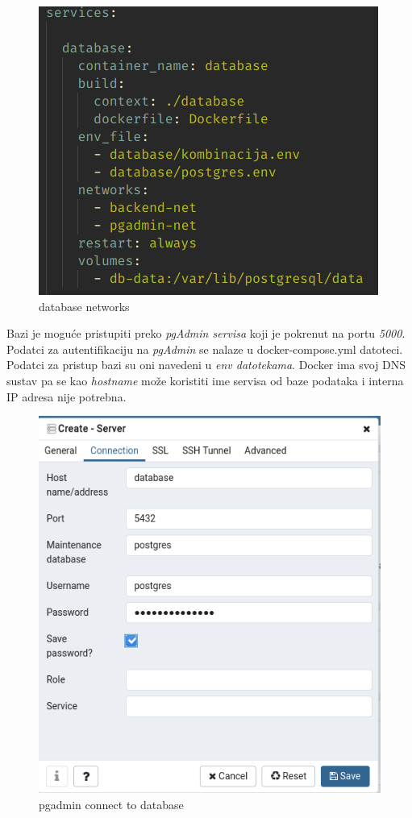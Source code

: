 		\begin{figure}[H]
					\includegraphics[scale=0.9]{figures/initdb.PNG}
					\centering
					\caption{database networks}
					\label{fig:sekv-uc13}
				\end{figure}
						
			
			
				
		Bazi je moguće pristupiti preko  \textit{pgAdmin servisa} koji je pokrenut na portu  \textit{5000}. Podatci za autentifikaciju na  \textit{pgAdmin} se nalaze u docker-compose.yml datoteci. Podatci za pristup bazi su oni navedeni u  \textit{env datotekama}. Docker ima svoj DNS sustav pa se kao  \textit{hostname} može koristiti ime servisa od baze podataka i interna IP adresa nije potrebna.		
				
		\begin{figure}[H]
					\includegraphics[scale=0.6]{figures/4-pgadmin.PNG}
					\centering
					\caption{pgadmin connect to database}
					\label{fig:sekv-uc13}
				\end{figure} 
												
